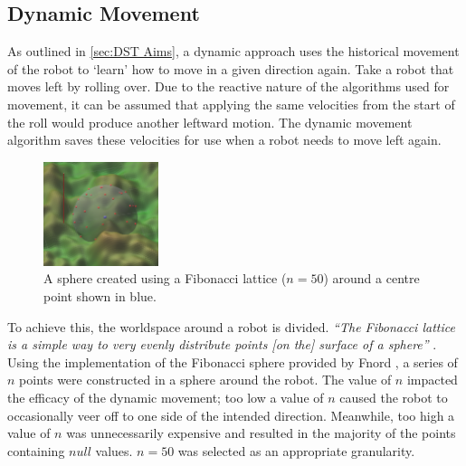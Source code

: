 \documentclass{article}
\begin{document}
\subsection{Dynamic Movement}
\label{sec:DST Imp}
As outlined in \ref{sec:DST Aims}, a dynamic approach uses the historical movement of the robot to ‘learn’ how to move in a given direction again. 
Take a robot that moves left by rolling over. Due to the reactive nature of the algorithms used for movement, it can be assumed that applying the same velocities from the start of the roll would produce another leftward motion. The dynamic movement algorithm saves these velocities for use when a robot needs to move left again. \\
\begin{figure}
    \centering
    \vspace*{-5mm}
    \includegraphics[width=0.3\textwidth]{spherePoints}
    \vspace*{-7mm}
    \caption{A sphere created using a Fibonacci lattice ($n=50$) around a centre point shown in blue.}
\end{figure}
To achieve this, the worldspace around a robot is divided. \textit{“The Fibonacci lattice is a simple way to very evenly distribute points [on the] surface of a sphere”} . Using the implementation of the Fibonacci sphere provided by Fnord , a series of $n$ points were constructed in a sphere around the robot. The value of $n$ impacted the efficacy of the dynamic movement; too low a value of $n$ caused the robot to occasionally veer off to one side of the intended direction. Meanwhile, too high a value of $n$ was unnecessarily expensive and resulted in the majority of the points containing $null$ values. $n=50$ was selected as an appropriate granularity.\\
\end{document}
